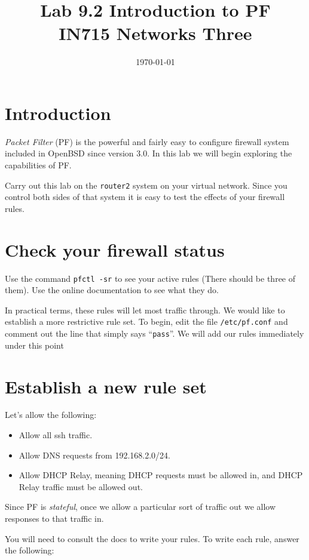\documentclass{article}
\begin{document}
\title{ Lab 9.2 Introduction to PF\\ IN715 Networks Three}
\date{\today}
\maketitle

\section*{Introduction}
\emph{Packet Filter} (PF) is the powerful and fairly easy to configure firewall system included in OpenBSD since version 3.0.  In this lab we will begin exploring the capabilities of PF.

Carry out this lab on the \texttt{router2} system on your virtual network.  Since you control both sides of that system it is easy to test the effects of your firewall rules.

\section{Check your firewall status}
Use the command \texttt{pfctl -sr} to see your active rules (There should be three of them).  Use the 
online documentation to see what they do.

In practical terms, these rules will let most traffic through.  We would like to establish a more restrictive rule set.  To begin, edit the file \texttt{/etc/pf.conf} and comment out the line that simply says ``\texttt{pass}''.  We will add our rules immediately under this point

\section{Establish a new rule set}
Let's allow the following:

\begin{itemize}
	\item Allow all ssh traffic.
	\item Allow DNS requests from 192.168.2.0/24.
	\item Allow DHCP Relay, meaning DHCP requests must be allowed in, and DHCP Relay 
		traffic must be allowed out.
\end{itemize}

Since PF is \emph{stateful}, once we allow a particular sort of traffic out we allow responses to that traffic in.

You will need to consult the docs to write your rules.  To write each rule, answer the following:
\end{document}
